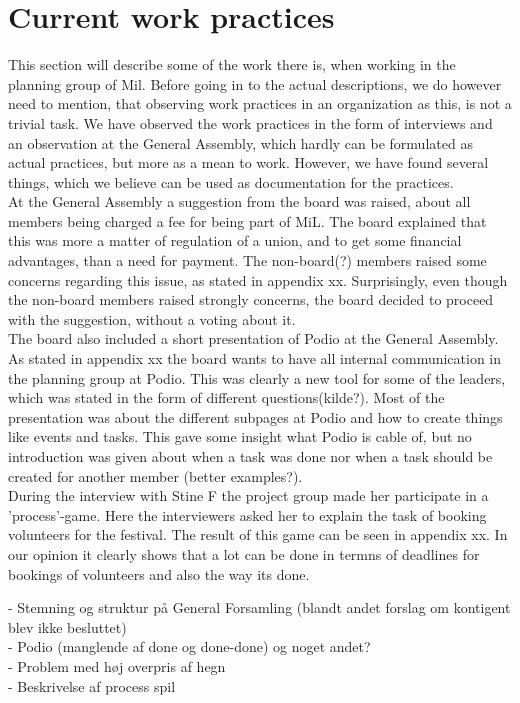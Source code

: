 \section{Current work practices}
This section will describe some of the work there is, when working in the planning group of Mil. Before going in to the actual descriptions, we do however need to mention, that observing work practices in an organization as this, is not a trivial task. We have observed the work practices in the form of interviews and an observation at the General Assembly, which hardly can be formulated as actual practices, but more as a mean to work. However, we have found several things, which we believe can be used as documentation for the practices. \\
At the General Assembly a suggestion from the board was raised, about all members being charged a fee for being part of MiL. The board explained that this was more a matter of regulation of a union, and to get some financial advantages, than a need for payment. The non-board(?) members raised some concerns regarding this issue, as stated in appendix xx. Surprisingly, even though the non-board members raised strongly concerns, the board decided to proceed with the suggestion, without a voting about it. \\
The board also included a short presentation of Podio at the General Assembly. As stated in appendix xx the board wants to have all internal communication in the planning group at Podio. This was clearly a new tool for some of the leaders, which was stated in the form of different questions(kilde?). Most of the presentation was about the different subpages at Podio and how to create things like events and tasks. This gave some insight what Podio is cable of, but no introduction was given about when a task was done nor when a task should be created for another member (better examples?).\\

During the interview with Stine F the project group made her participate in a 'process'-game. Here the interviewers asked her to explain the task of booking volunteers for the festival. The result of this game can be seen in appendix xx. In our opinion it clearly shows that a lot can be done in termns of deadlines for bookings of volunteers and also the way its done.

- Stemning og struktur på General Forsamling (blandt andet forslag om kontigent blev ikke besluttet)\\
- Podio (manglende af done og done-done) og noget andet?\\
- Problem med høj overpris af hegn\\
- Beskrivelse af process spil

